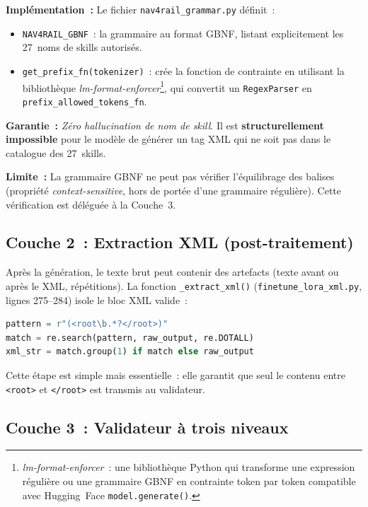 \documentclass[a4paper,11pt]{article}
\newcommand{\file}[1]{\texttt{#1}}
\newcommand{\tech}[1]{\textsl{#1}}
\begin{document}
\textbf{Implémentation~:} Le fichier \file{nav4rail\_grammar.py} définit~:
\begin{itemize}
    \item \texttt{NAV4RAIL\_GBNF}~: la grammaire au format GBNF, listant
    explicitement les 27~noms de skills autorisés.
    \item \texttt{get\_prefix\_fn(tokenizer)}~: crée la fonction de
    contrainte en utilisant la bibliothèque
    \tech{lm-format-enforcer}\footnote{\tech{lm-format-enforcer}~: une
    bibliothèque Python qui transforme une expression régulière ou une
    grammaire GBNF en contrainte token par token compatible avec
    Hugging~Face \texttt{model.generate()}.}, qui convertit un
    \texttt{RegexParser} en \texttt{prefix\_allowed\_tokens\_fn}.
\end{itemize}

\textbf{Garantie~:} \emph{Zéro hallucination de nom de skill}. Il est
\textbf{structurellement impossible} pour le modèle de générer un tag XML
qui ne soit pas dans le catalogue des 27~skills.

\textbf{Limite~:} La grammaire GBNF ne peut pas vérifier l'équilibrage
des balises (propriété \emph{context-sensitive}, hors de portée d'une
grammaire régulière). Cette vérification est déléguée à la Couche~3.

\subsection{Couche 2~: Extraction XML (post-traitement)}

Après la génération, le texte brut peut contenir des artefacts (texte
avant ou après le XML, répétitions). La fonction \texttt{\_extract\_xml()}
(\file{finetune\_lora\_xml.py}, lignes 275--284) isole le bloc XML valide~:

\begin{lstlisting}[language=Python]
pattern = r"(<root\b.*?</root>)"
match = re.search(pattern, raw_output, re.DOTALL)
xml_str = match.group(1) if match else raw_output
\end{lstlisting}

Cette étape est simple mais essentielle~: elle garantit que seul le contenu
entre \texttt{<root>} et \texttt{</root>} est transmis au validateur.

\subsection{Couche 3~: Validateur à trois niveaux}
\end{document}
